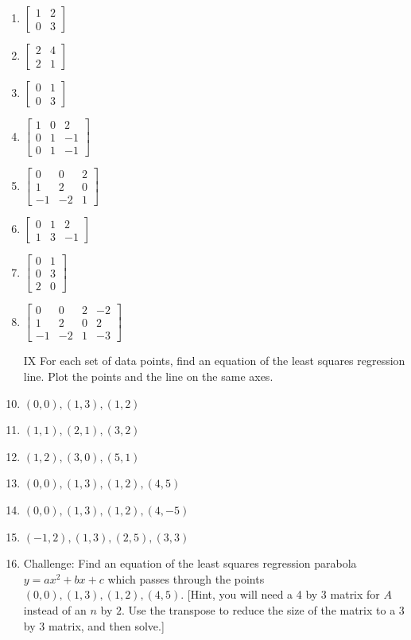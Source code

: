 \documentclass[10pt]{amsart}
\begin{document}
\begin{multicols}{2}
\begin{enumerate}
\item $\begin{bmatrix} 1&2\\0&3 \end{bmatrix}$
\item $\begin{bmatrix} 2&4\\2&1 \end{bmatrix}$
\item $\begin{bmatrix} 0&1\\0&3 \end{bmatrix}$
\item $\begin{bmatrix} 1&0&2\\0&1&-1\\0&1&-1 \end{bmatrix}$
\item $\begin{bmatrix} 0&0&2\\1&2&0\\-1&-2&1 \end{bmatrix}$

\item $\begin{bmatrix} 0&1&2\\1&3&-1 \end{bmatrix}$
\item $\begin{bmatrix} 0&1\\0&3\\2&0 \end{bmatrix}$

\item $\begin{bmatrix} 0&0&2&-2\\1&2&0&2\\-1&-2&1&-3 \end{bmatrix}$


\vspace{.3in}
\item[IX] For each set of data points, find an equation of the least squares regression line. Plot the points and the line on the same axes.

\item $(0,0),(1,3),(1,2)$
\item $(1,1),(2,1),(3,2)$
\item $(1,2),(3,0),(5,1)$
\item $(0,0),(1,3),(1,2),(4,5)$
\item $(0,0),(1,3),(1,2),(4,-5)$
\item $(-1,2),(1,3),(2,5),(3,3)$
\item Challenge: Find an equation of the least squares regression parabola $y=ax^2+bx+c$ which passes through the points $(0,0),(1,3),(1,2),(4,5)$. [Hint, you will need a 4 by 3 matrix for $A$ instead of an $n$ by $2$. Use the transpose to reduce the size of the matrix to a 3 by 3 matrix, and then solve.]



\end{enumerate}
\end{multicols}
\end{document}
